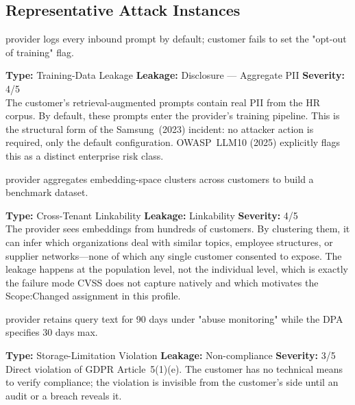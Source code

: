 \documentclass[12pt, a4paper]{report}
\begin{document}
\subsection{Representative Attack Instances}

\vspace{4pt}
\begin{attackbox}
  provider logs every inbound prompt by default;
        customer fails to set the "opt-out of training" flag.
\end{attackbox}
\begin{prosebox}
\small\textbf{Type:} Training-Data Leakage \quad
\textbf{Leakage:} Disclosure --- Aggregate PII \quad \textbf{Severity:} 4/5\\[2pt]
The customer's retrieval-augmented prompts contain real PII from the HR
corpus. By default, these prompts enter the provider's training pipeline.
This is the structural form of the Samsung~(2023) incident: no attacker
action is required, only the default configuration. OWASP~LLM10 (2025)
explicitly flags this as a distinct enterprise risk class.
\end{prosebox}

\vspace{4pt}
\begin{attackbox}
  provider aggregates embedding-space
        clusters across customers to build a benchmark dataset.
\end{attackbox}
\begin{prosebox}
\small\textbf{Type:} Cross-Tenant Linkability \quad
\textbf{Leakage:} Linkability \quad \textbf{Severity:} 4/5\\[2pt]
The provider sees embeddings from hundreds of customers. By clustering
them, it can infer which organizations deal with similar topics, employee
structures, or supplier networks---none of which any single customer
consented to expose. The leakage happens at the population level, not
the individual level, which is exactly the failure mode CVSS does not
capture natively and which motivates the Scope:Changed assignment
in this profile.
\end{prosebox}

\vspace{4pt}
\begin{attackbox}
  provider retains query text for 90 days
        under "abuse monitoring" while the DPA specifies 30 days max.
\end{attackbox}
\begin{prosebox}
\small\textbf{Type:} Storage-Limitation Violation \quad
\textbf{Leakage:} Non-compliance \quad \textbf{Severity:} 3/5\\[2pt]
Direct violation of GDPR Article~5(1)(e). The customer has no technical
means to verify compliance; the violation is invisible from the customer's
side until an audit or a breach reveals it.
\end{prosebox}
\end{document}
